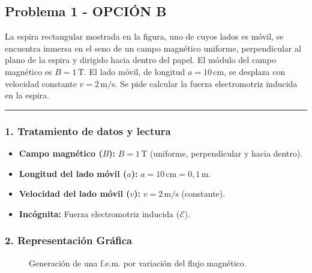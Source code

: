 \newpage

\subsection{Problema 1 - OPCIÓN B}
\label{subsec:4B_2001_sep_ext}

\begin{cajaenunciado}
La espira rectangular mostrada en la figura, uno de cuyos lados es móvil, se encuentra inmersa en el seno de un campo magnético uniforme, perpendicular al plano de la espira y dirigido hacia dentro del papel. El módulo del campo magnético es $B=1\,\text{T}$. El lado móvil, de longitud $a=10\,\text{cm}$, se desplaza con velocidad constante $v=2\,\text{m/s}$. Se pide calcular la fuerza electromotriz inducida en la espira.
\end{cajaenunciado}
\hrule

\subsubsection*{1. Tratamiento de datos y lectura}
\begin{itemize}
    \item \textbf{Campo magnético ($B$):} $B = 1 \, \text{T}$ (uniforme, perpendicular y hacia dentro).
    \item \textbf{Longitud del lado móvil ($a$):} $a = 10 \, \text{cm} = 0,1 \, \text{m}$.
    \item \textbf{Velocidad del lado móvil ($v$):} $v = 2 \, \text{m/s}$ (constante).
    \item \textbf{Incógnita:} Fuerza electromotriz inducida ($\mathcal{E}$).
\end{itemize}

\subsubsection*{2. Representación Gráfica}
\begin{figure}[H]
    \centering
    \caption{Generación de una f.e.m. por variación del flujo magnético.}
\end{figure}

